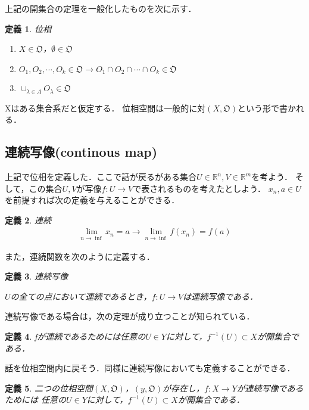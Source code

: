 \documentclass[11pt,a4j]{jarticle}
\newtheorem{dfn}{定義}
\begin{document}
上記の開集合の定理を一般化したものを次に示す．
\begin{dfn}
    位相
    \begin{enumerate}
        \renewcommand{\labelenumi}{(\roman{enumi})}
        \item $X \in \mathfrak{O}$，$\emptyset \in \mathfrak{O}$
        \item $O_1,O_2,\cdots,O_k \in \mathfrak{O} \rightarrow O_1 \cap O_2 \cap \cdots \cap O_k \in \mathfrak{O} $
        \item $\cup_{\lambda \in A} O_\lambda \in \mathfrak{O}$
    \end{enumerate} 
\end{dfn}
Xはある集合系だと仮定する．
位相空間は一般的に対$(X,\mathfrak{O})$という形で書かれる．

\subsection{連続写像(continous map)}
上記で位相を定義した．ここで話が戻るがある集合$U\in \mathbb{R}^n,V\in \mathbb{R}^m$を考よう．
そして，この集合$U,V$が写像$f:U\rightarrow V$で表されるものを考えたとしよう．
$x_n,a \in U $を前提すれば次の定義を与えることができる．
\begin{dfn}
   連続
    \begin{eqnarray}
        \lim_{n \rightarrow \inf} x_n=a \rightarrow \lim_{n \rightarrow \inf} f(x_n) = f(a)
    \end{eqnarray} 
\end{dfn}
また，連続関数を次のように定義する．
\begin{dfn}
    連続写像

    $U$の全ての点において連続であるとき，$f:U\rightarrow V$は連続写像である．
\end{dfn}

連続写像である場合は，次の定理が成り立つことが知られている．
\begin{dfn}

    fが連続であるためには任意の$U \in Y$に対して，$f^{-1}(U) \subset X$が開集合である．
\end{dfn}


話を位相空間内に戻そう．同様に連続写像においても定義することができる．
\begin{dfn}
    二つの位相空間$(X,\mathfrak{O})$，$(y,\mathfrak{O})$が存在し，$f:X \rightarrow Y$が連続写像であるためには
    任意の$U \in Y$に対して，$f^{-1}(U) \subset X$が開集合である．
\end{dfn}
\end{document}
